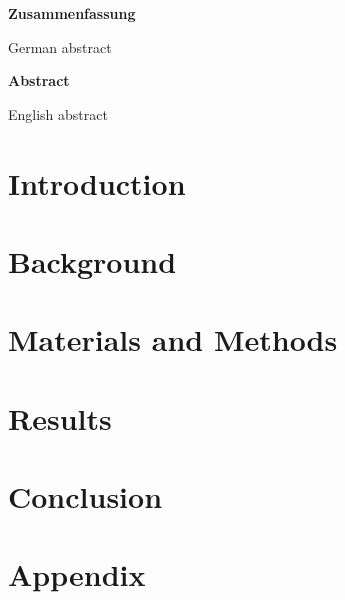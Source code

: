 \documentclass[encoding=utf8,german]{scrreprt}
\begin{document}
\newpage
\thispagestyle{empty}
\noindent
\begin{centering}
    \huge\textbf{Zusammenfassung}
\end{centering}
\bigskip\newline
German abstract


\bigskip\bigskip
\begin{centering}
    \huge\textbf{Abstract}
\end{centering}
\bigskip\newline
English abstract

\newpage
\tableofcontents
\clearpage

\newpage

\listoffigures
\newpage
\listoftables
\newpage
\lstlistoflistings
\newpage


\chapter{Introduction}
\chapter{Background}
\chapter{Materials and Methods}
\chapter{Results}
\chapter{Conclusion}
\clearpage




\setcounter{page}{1}
\printbibliography\clearpage


\appendix
\chapter{Appendix}\clearpage
\end{document}
